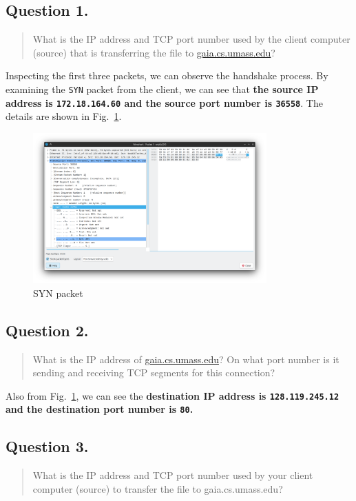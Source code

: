 \documentclass{cshwk}
\begin{document}
\subsection*{Question 1.}
\begin{quote}
    What is the IP address and TCP port number used by the client computer (source) that is transferring the file to \href{http://giai.cs.umass.edu}{gaia.cs.umass.edu}?
\end{quote}

Inspecting the first three packets, we can observe the handshake process. By examining the \texttt{SYN} packet from the client, we can see that \textbf{the source IP address is \texttt{172.18.164.60} and the source port number is \texttt{36558}}. The details are shown in Fig.~\ref{fig:SYN}.


\begin{figure}[htbp]
    \centering
    \includegraphics[width=0.8\textwidth]{./lab3-2.png}
    \caption{SYN packet}
    \label{fig:SYN}
\end{figure}

\subsection*{Question 2.}
\begin{quote}
    What is the IP address of \href{http://gaia.cs.umass.edu}{gaia.cs.umass.edu}? On what port number is it sending and receiving TCP segments for this connection?
\end{quote}

Also from Fig.~\ref{fig:SYN}, we can see the \textbf{destination IP address is \texttt{128.119.245.12} and the destination port number is \texttt{80}.}

\subsection*{Question 3.}
\begin{quote}
    What is the IP address and TCP port number used by your client computer (source) to transfer the file to gaia.cs.umass.edu?
\end{quote}
\end{document}
